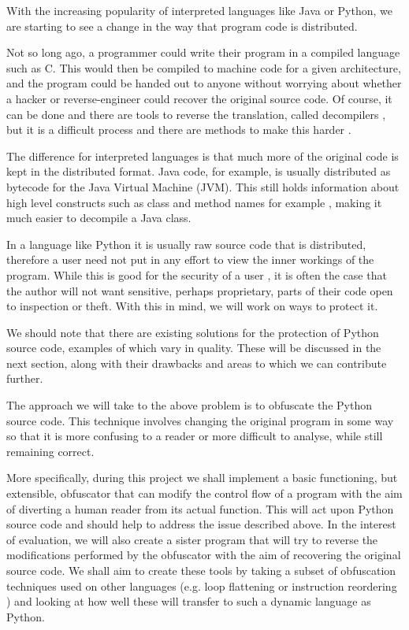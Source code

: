 \documentclass[twoside,a4paper]{report}
\begin{document}
With the increasing popularity of interpreted languages like Java or Python, we are starting
to see a change in the way that program code is distributed.

Not so long ago, a programmer could write their program in a compiled language such as C. This would then be compiled
to machine code for a given architecture, and the program could be handed out to anyone without
worrying about whether a hacker or reverse-engineer could recover the original source code.
Of course, it can be done and there are tools to reverse the translation, called decompilers \cite{cdecomp}, but it
is a difficult process and there are methods to make this harder \cite{disres}.

The difference for interpreted languages is that much more of the original code is kept in the
distributed format. Java code, for example, is usually distributed as bytecode for the Java Virtual
Machine (JVM). This still holds information about high level constructs such as class and method names for example \cite{classinfo},
making it much easier to decompile a Java class.

In a language like Python it is usually raw source code that is distributed, therefore a
user need not put in any effort to view the inner workings of the program. While this is good
for the security of a user \cite{noobf}, it is often the case that the author will not want sensitive,
perhaps proprietary, parts of their code open to inspection or theft. With this in mind, we will work on ways to protect it.

We should note that there are existing solutions for the protection of Python source code, examples of which vary in quality.
These will be discussed in the next section, along with their drawbacks and areas to which we can contribute further.

The approach we will take to the above problem is to obfuscate the Python source code. This technique involves changing the
original program in some way so that it is more confusing to a reader or more difficult to analyse, while still remaining correct.

More specifically, during this project we shall implement a basic functioning, but extensible, obfuscator
that can modify the control flow of a program with the aim of diverting a human reader from its actual
function. This will act upon Python source code and should help to address the issue described above.
In the interest of evaluation, we will also create a sister program that will try to reverse the modifications performed by the
obfuscator with the aim of recovering the original source code. 
We shall aim to create these tools by taking a subset of obfuscation techniques used on other languages (e.g.
loop flattening or instruction reordering \cite{taxobftrans}) and looking at how well these will transfer to such a dynamic language as Python.
\end{document}
